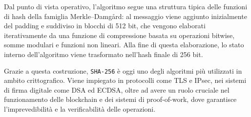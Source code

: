 Dal punto di vista operativo, l'algoritmo segue una struttura tipica delle funzioni di hash della famiglia Merkle–Damgård: al messaggio viene aggiunto inizialmente del padding e suddiviso in blocchi di 512 bit, che vengono elaborati iterativamente da una funzione di compressione basata su operazioni bitwise, somme modulari e funzioni non lineari. Alla fine di questa elaborazione, lo stato interno dell'algoritmo viene trasformato nell'hash finale di 256 bit.

Grazie a questa costruzione, \texttt{SHA-256} è oggi uno degli algoritmi più utilizzati in ambito crittografico. Viene impiegato in protocolli come TLS e IPsec, nei sistemi di firma digitale come DSA ed ECDSA, oltre ad avere un ruolo cruciale nel funzionamento delle blockchain e dei sistemi di proof-of-work, dove garantisce l'imprevedibilità e la verificabilità delle operazioni.